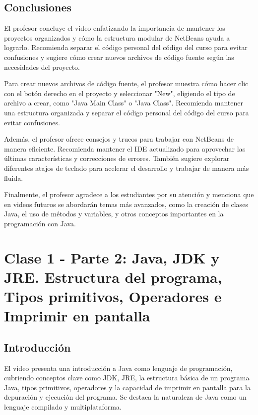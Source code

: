 \documentclass[a4paper]{report}
\begin{document}
\section{Conclusiones}

El profesor concluye el video enfatizando la importancia de mantener los proyectos organizados y cómo la estructura modular de NetBeans ayuda a lograrlo. Recomienda separar el código personal del código del curso para evitar confusiones y sugiere cómo crear nuevos archivos de código fuente según las necesidades del proyecto.



Para crear nuevos archivos de código fuente, el profesor muestra cómo hacer clic con el botón derecho en el proyecto y seleccionar "New", eligiendo el tipo de archivo a crear, como "Java Main Class" o "Java Class". Recomienda mantener una estructura organizada y separar el código personal del código del curso para evitar confusiones.



Además, el profesor ofrece consejos y trucos para trabajar con NetBeans de manera eficiente. Recomienda mantener el IDE actualizado para aprovechar las últimas características y correcciones de errores. También sugiere explorar diferentes atajos de teclado para acelerar el desarrollo y trabajar de manera más fluida.



Finalmente, el profesor agradece a los estudiantes por su atención y menciona que en videos futuros se abordarán temas más avanzados, como la creación de clases Java, el uso de métodos y variables, y otros conceptos importantes en la programación con Java.



\newpage
\maketitle


\chapter{Clase 1 - Parte 2: Java, JDK y JRE. Estructura del programa, Tipos primitivos, Operadores e Imprimir en pantalla}
\section{Introducción}

El video presenta una introducción a Java como lenguaje de programación, cubriendo conceptos clave como JDK, JRE, la estructura básica de un programa Java, tipos primitivos, operadores y la capacidad de imprimir en pantalla para la depuración y ejecución del programa. Se destaca la naturaleza de Java como un lenguaje compilado y multiplataforma.
\end{document}
